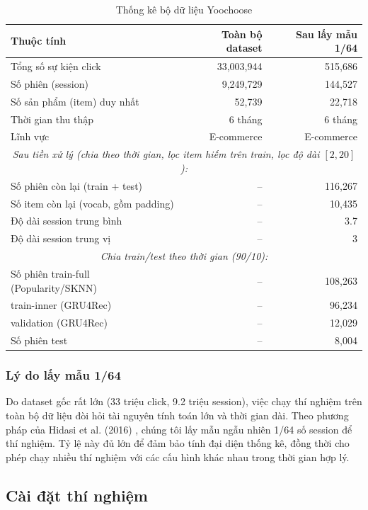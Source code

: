 \documentclass[12pt, a4paper]{article}
\begin{document}
\begin{table}[H]
\centering
\caption{Thống kê bộ dữ liệu Yoochoose}
\label{tab:dataset_stats}
\begin{tabular}{lrr}
\toprule
\textbf{Thuộc tính} & \textbf{Toàn bộ dataset} & \textbf{Sau lấy mẫu 1/64} \\
\midrule
Tổng số sự kiện click & 33,003,944 & 515,686 \\
Số phiên (session) & 9,249,729 & 144,527 \\
Số sản phẩm (item) duy nhất & 52,739 & 22,718 \\
Thời gian thu thập & 6 tháng & 6 tháng \\
Lĩnh vực & E-commerce & E-commerce \\
\midrule
\multicolumn{3}{c}{\textit{Sau tiền xử lý (chia theo thời gian, lọc item hiếm trên train, lọc độ dài $[2,20]$):}} \\
\midrule
Số phiên còn lại (train + test) & -- & 116,267 \\
Số item còn lại (vocab, gồm padding) & -- & 10,435 \\
Độ dài session trung bình & -- & 3.7 \\
Độ dài session trung vị & -- & 3 \\
\midrule
\multicolumn{3}{c}{\textit{Chia train/test theo thời gian (90/10):}} \\
\midrule
Số phiên train-full (Popularity/SKNN) & -- & 108,263 \\
\quad train-inner (GRU4Rec) & -- & 96,234 \\
\quad validation (GRU4Rec) & -- & 12,029 \\
Số phiên test & -- & 8,004 \\
\bottomrule
\end{tabular}
\end{table}

\subsubsection{Lý do lấy mẫu 1/64}

Do dataset gốc rất lớn (33 triệu click, 9.2 triệu session), việc chạy thí nghiệm trên toàn bộ dữ liệu đòi hỏi tài nguyên tính toán lớn và thời gian dài. Theo phương pháp của Hidasi et al. (2016) \cite{hidasi2016}, chúng tôi lấy mẫu ngẫu nhiên 1/64 số session để thí nghiệm. Tỷ lệ này đủ lớn để đảm bảo tính đại diện thống kê, đồng thời cho phép chạy nhiều thí nghiệm với các cấu hình khác nhau trong thời gian hợp lý.

\subsection{Cài đặt thí nghiệm}
\end{document}
